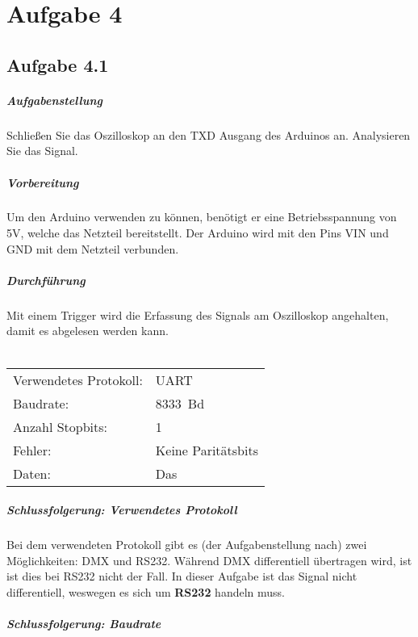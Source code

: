\chapter{Aufgabe 4}
\section{Aufgabe 4.1}
\paragraph{Aufgabenstellung}
Schließen Sie das Oszilloskop an den TXD Ausgang des Arduinos an. Analysieren Sie das Signal.

\paragraph{Vorbereitung}
Um den Arduino verwenden zu können, benötigt er eine Betriebsspannung von 5V, welche das Netzteil bereitstellt. Der Arduino wird mit den Pins VIN und GND mit dem Netzteil verbunden.

\paragraph{Durchführung}
Mit einem Trigger wird die Erfassung des Signals am Oszilloskop angehalten, damit es abgelesen werden kann.\\\\
\begin{tabular}{ll}
	Verwendetes Protokoll: & UART       \\
	Baudrate:              & \SI{8333}{Bd} \\
	Anzahl Stopbits:       & 1          \\
	Fehler:                & Keine Paritätsbits       \\
	Daten:                 & Das
\end{tabular}

\paragraph{Schlussfolgerung: Verwendetes Protokoll}
Bei dem verwendeten Protokoll gibt es (der Aufgabenstellung nach) zwei Möglichkeiten: DMX und RS232. Während DMX differentiell übertragen wird, ist ist dies bei RS232 nicht der Fall. In dieser Aufgabe ist das Signal nicht differentiell, weswegen es sich um \textbf{RS232} handeln muss.

\paragraph{Schlussfolgerung: Baudrate}

